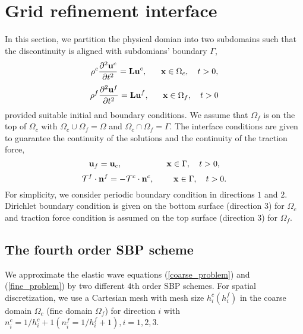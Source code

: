\documentclass[a4paper]{article}
\begin{document}
\section{Grid refinement interface}
In this section, we partition the physical domian into two subdomains such that the discontinuity is aligned with subdomians' boundary $\Gamma$,
\begin{equation}\label{coarse_problem}
\rho^c\frac{\partial ^2 {\bf u}^c}{\partial t^2} = {\bf Lu}^c, \ \ \ \ \ {\bf x} \in \Omega_c,\ \ \ t>0,
\end{equation}
\begin{equation}\label{fine_problem}
\rho^f\frac{\partial ^2 {\bf u}^f}{\partial t^2} = {\bf Lu}^f, \ \ \ \ \ {\bf x} \in \Omega_f,\ \ \ t>0
\end{equation}
provided suitable initial and boundary conditions. We assume that $\Omega_f$ is on the top of $\Omega_c$ with $\Omega_c\cup\Omega_f = \Omega$ and $\Omega_c\cap\Omega_f = \Gamma$. The interface conditions are given to guarantee the continuity of the solutions and the continuity of the traction force,
\begin{equation}\label{continuity_sol}
{\bf u}_f = {\bf u}_c, \ \ \ \ \ \ \ \ \ \ \ \ \ \ \ \ {\bf x}\in \Gamma, \ \ \ t>0, 
\end{equation}
\begin{equation}\label{continuity_trac}
\mathcal{T}^f\cdot{\bf n}^f = -\mathcal{T}^c\cdot{\bf n}^c,  \ \ \ \ \ \ \  {\bf x}\in \Gamma, \ \ \ t>0.
\end{equation}
For simplicity, we consider periodic boundary condition in directions $1$ and $2$. Dirichlet boundary condition is given on the bottom surface (direction $3$) for $\Omega_c$ and traction force condition is assumed on the top surface (direction $3$) for $\Omega_f$.

\subsection{The fourth order SBP scheme}\label{sub_section_4_1}
We approximate the elastic wave equations (\ref{coarse_problem}) and (\ref{fine_problem}) by two different $4$th order SBP schemes. For spatial discretization, we use a Cartesian mesh with mesh size $h_i^c (h_i^f)$ in the coarse domain $\Omega_c$ (fine domain $\Omega_f$) for direction $i$ with $n_i^c = 1/h_i^c +1 (n_i^f = 1/h_i^f +1), i = 1,2,3$.
\end{document}
